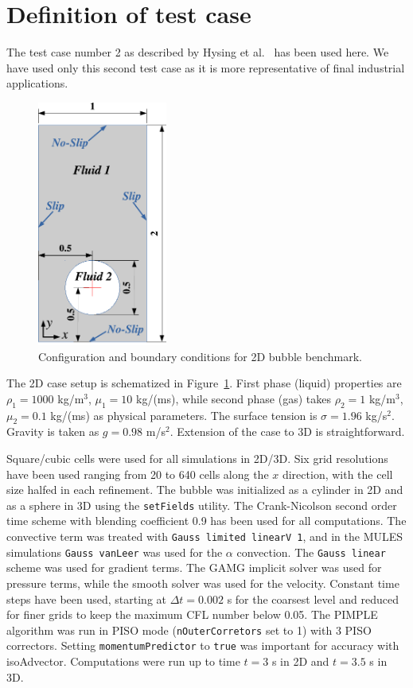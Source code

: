 \documentclass[review]{elsarticle}
\begin{document}
\section{Definition of test case}\label{sec_testcasedef}
The test case number 2 as described by Hysing et al.~\cite{Hysing2009} has been used here. 
We have used only this second test case as it is more representative of final industrial
applications. 
\begin{figure}[!h]
\begin{center}
 \vspace{-5mm}
 \includegraphics[width=4.25cm]{figures/benchmark_scheme.pdf}
 \vspace{-3mm}
\end{center}
\caption{Configuration and boundary conditions for 2D bubble benchmark.}
\label{fig:1}
\end{figure}
The 2D case setup is schematized in Figure~\ref{fig:1}. First phase (liquid) properties are 
$\rho_1=1000$ kg/m$^3$, $\mu_1=10$ kg/(ms), while second phase (gas) takes $\rho_2=1$ kg/m$^3$, $\mu_2=0.1$ kg/(ms) as physical parameters. 
The surface tension is $\sigma=1.96$ kg/s$^2$. Gravity is taken as $g=0.98$ m/s$^2$. Extension of the case to 3D is straightforward.

Square/cubic cells were used for all simulations in 2D/3D. Six grid resolutions have been used ranging from 20 to 640 cells along the $x$ direction, with the cell size halfed in each refinement. The bubble was initialized as a cylinder in 2D and as a sphere in 3D using the \verb+setFields+ utility. The Crank-Nicolson second order time scheme with blending coefficient 0.9 has been used for all computations. The convective term was treated with \verb+Gauss limited linearV 1+, and in the MULES simulations \verb+Gauss vanLeer+ was used for the $\alpha$ convection. The \verb+Gauss linear+ scheme was used for gradient terms. The GAMG implicit solver was used for pressure terms, while the smooth solver was used for the velocity. Constant time steps have been used, starting at $\Delta t=0.002$ s for the coarsest level and reduced for finer grids to keep the maximum CFL number below 0.05. The PIMPLE algorithm was run in PISO mode (\verb+nOuterCorretors+ set to 1) with 3 PISO correctors. Setting \verb+momentumPredictor+ to \verb+true+ was important for accuracy with isoAdvector. Computations were run up to time $t=3$ s in 2D and $t=3.5$ s in 3D. 
\end{document}
